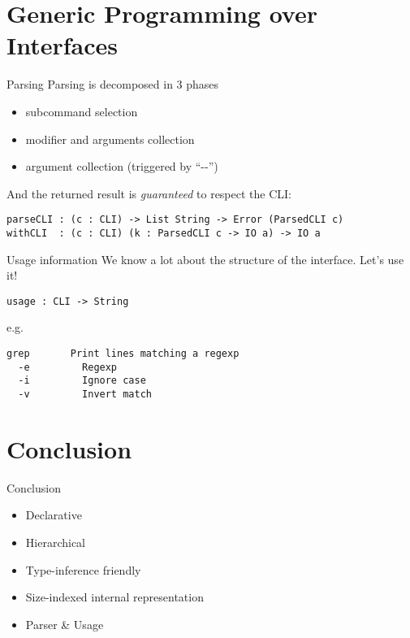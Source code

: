 \documentclass[dvipsnames]{beamer}
\begin{document}
\section{Generic Programming over Interfaces}

\begin{frame}[fragile]{Parsing}
  Parsing is decomposed in 3 phases

  \begin{itemize}
    \item subcommand selection
    \item modifier and arguments collection
    \item argument collection (triggered by ``-{}-'')
  \end{itemize}

  And the returned result is \emph{guaranteed} to respect the CLI:

  \begin{verbatim}
parseCLI : (c : CLI) -> List String -> Error (ParsedCLI c)
withCLI  : (c : CLI) (k : ParsedCLI c -> IO a) -> IO a
  \end{verbatim}
\end{frame}

\begin{frame}[fragile]{Usage information}
We know a lot about the structure of the interface. Let's use it!
\begin{verbatim}
usage : CLI -> String
\end{verbatim}

e.g.

\begin{verbatim}
grep       Print lines matching a regexp
  -e         Regexp
  -i         Ignore case
  -v         Invert match
\end{verbatim}
\end{frame}

\section{Conclusion}
\begin{frame}{Conclusion}
  \begin{itemize}
   \item Declarative
   \item Hierarchical
   \item Type-inference friendly
   \item Size-indexed internal representation
   \item Parser \& Usage
  \end{itemize}
\end{frame}
\end{document}
